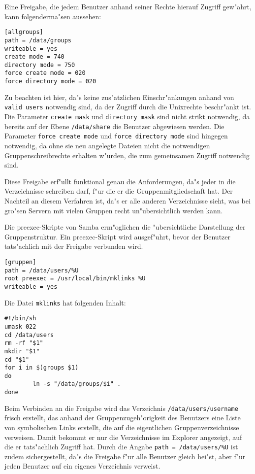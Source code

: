 \documentclass{scrartcl}\usepackage{pslatex}\typearea{12}
\newcommand{\param}{\texttt}
\newcommand{\dateistyle}{\texttt}
\begin{document}
Eine Freigabe, die jedem Benutzer anhand seiner Rechte hierauf Zugriff
gew"ahrt, kann folgenderma"sen aussehen:

{\small\begin{verbatim}
[allgroups]
path = /data/groups
writeable = yes
create mode = 740
directory mode = 750
force create mode = 020
force directory mode = 020
\end{verbatim}
}

Zu beachten ist hier, da"s keine zus"atzlichen Einschr"ankungen anhand
von \param{valid users} notwendig sind, da der Zugriff durch die
Unixrechte beschr"ankt ist. Die Parameter \param{create mask} und
\param{directory mask} sind nicht strikt notwendig, da bereits auf der
Ebene \dateistyle{/data/share} die Benutzer abgewiesen werden. Die
Parameter \dateistyle{force create mode} und \param{force directory mode}
sind hingegen notwendig, da ohne sie neu angelegte Dateien nicht die
notwendigen Gruppenschreibrechte erhalten w"urden, die zum gemeinsamen
Zugriff notwendig sind.

Diese Freigabe erf"ullt funktional genau die Anforderungen, da"s
jeder in die Verzeichnisse schreiben darf, f"ur die er die
Gruppenmitgliedschaft hat. Der Nachteil an diesem Verfahren ist, da"s
er alle anderen Verzeichnisse sieht, was bei gro"sen Servern mit
vielen Gruppen recht un"ubersichtlich werden kann.

Die preexec-Skripte von Samba erm"oglichen die "ubersichtliche
Darstellung der Gruppenstruktur. Ein preexec-Skript wird ausgef"uhrt,
bevor der Benutzer tats"achlich mit der Freigabe verbunden wird.

{\small\begin{verbatim}
[gruppen]
path = /data/users/%U
root preexec = /usr/local/bin/mklinks %U
writeable = yes
\end{verbatim}
}

Die Datei \dateistyle{mklinks} hat folgenden Inhalt:

{\small\begin{verbatim}
#!/bin/sh
umask 022
cd /data/users
rm -rf "$1"
mkdir "$1"
cd "$1"
for i in $(groups $1)
do
        ln -s "/data/groups/$i" .
done
\end{verbatim}
}

Beim Verbinden an die Freigabe wird das Verzeichnis
\dateistyle{/data/users/username} frisch erstellt, das anhand der
Gruppenzugeh"origkeit des Benutzers eine Liste von symbolischen Links
erstellt, die auf die eigentlichen Gruppenverzeichnisse verweisen.
Damit bekommt er nur die Verzeichnisse im Explorer angezeigt, auf die
er tats"achlich Zugriff hat. Durch die Angabe \param{path =  
/data/users/\%U} ist zudem sichergestellt, da"s die Freigabe f"ur
alle Benutzer gleich hei"st, aber f"ur jeden Benutzer auf ein eigenes
Verzeichnis verweist.
\end{document}
